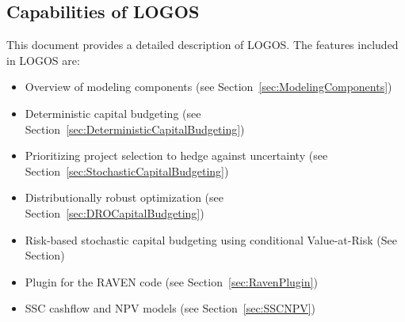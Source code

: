 \subsection{Capabilities of LOGOS}
This document provides a detailed description of LOGOS. 
The features included in LOGOS are:
\begin{itemize}
    \item Overview of modeling components (see Section~\ref{sec:ModelingComponents})
	\item Deterministic capital budgeting (see Section~\ref{sec:DeterministicCapitalBudgeting})
	\item Prioritizing project selection to hedge against uncertainty (see Section~\ref{sec:StochasticCapitalBudgeting})
  \item Distributionally robust optimization (see Section~\ref{sec:DROCapitalBudgeting})
  \item Risk-based stochastic capital budgeting using conditional Value-at-Risk (See Section)
  \item Plugin for the RAVEN code (see Section~\ref{sec:RavenPlugin})
	\item SSC cashflow and NPV models (see Section~\ref{sec:SSCNPV})
\end{itemize}
